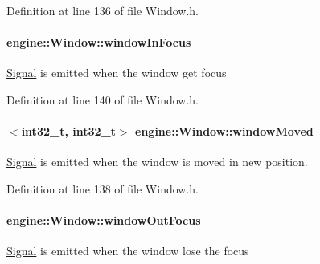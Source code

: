 Definition at line 136 of file Window.\+h.

\paragraph[{\texorpdfstring{window\+In\+Focus}{windowInFocus}}]{ engine\+::\+Window\+::window\+In\+Focus\hspace{0.3cm}{\ttfamily [inherited]}}\hypertarget{a00082_a2a81dc83b5e8433eb39e1ca8263d0c0f}{}\label{a00082_a2a81dc83b5e8433eb39e1ca8263d0c0f}
\hyperlink{a00065}{Signal} is emitted when the window get focus 

Definition at line 140 of file Window.\+h.

\paragraph[{\texorpdfstring{window\+Moved}{windowMoved}}]{$<$int32\+\_\+t, int32\+\_\+t$>$ engine\+::\+Window\+::window\+Moved\hspace{0.3cm}{\ttfamily [inherited]}}\hypertarget{a00082_a4bdb42d789ed9587ff8f840065752506}{}\label{a00082_a4bdb42d789ed9587ff8f840065752506}
\hyperlink{a00065}{Signal} is emitted when the window is moved in new position. 

Definition at line 138 of file Window.\+h.

\paragraph[{\texorpdfstring{window\+Out\+Focus}{windowOutFocus}}]{ engine\+::\+Window\+::window\+Out\+Focus\hspace{0.3cm}{\ttfamily [inherited]}}\hypertarget{a00082_af6f8cc0d616685683d5c6b52b4cc07d0}{}\label{a00082_af6f8cc0d616685683d5c6b52b4cc07d0}
\hyperlink{a00065}{Signal} is emitted when the window lose the focus 

